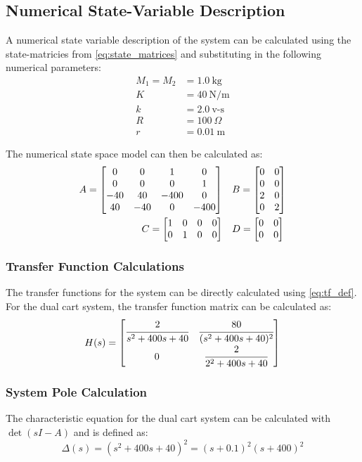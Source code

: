 \documentclass[]{article}
\begin{document}
	\subsection{Numerical State-Variable Description}
		A numerical state variable description of the system can be calculated using the state-matricies from \eqref{eq:state_matrices} and substituting in the following numerical parameters:
		\begin{align*}
			M_1 = M_2 &= 1.0 \ \text{kg} \\
			K &= 40 \ \text{N/m}\\
			k &= 2.0 \ \text{v-s} \\
			R &= 100  \ \Omega \\
			r &= 0.01 \ \text{m}
		\end{align*}
	
		The numerical state space model can then be calculated as:
		 \begin{equation}
			\begin{aligned}
				A = \mqty[	0	& 0		& 1		& 0\\
							0	& 0	 	& 0		& 1\\
							-40	& 40	& -400	& 0\\
							40	& -40	& 0		& -400
							] \ \ \
				&B = \mqty[ 0	& 0\\
							0	& 0\\
							2	& 0\\
							0	& 2
							]\\
				C = \mqty[	1	&0	&0	&0\\
							0	&1	&0	&0] \ \ \
				&D = \mqty[\zmat{2}{2}]
			\end{aligned}
			\label{eq:carts_state_matrices}
		\end{equation}
		
		\subsubsection{Transfer Function Calculations}
			The transfer functions for the system can be directly calculated using \eqref{eq:tf_def}. For the dual cart system, the transfer function matrix can be calculated as:
			\begin{equation}
				H(s) = \mqty[	\cfrac{2}{s^2+400s+40}	&\cfrac{80}{(s^2+400s+40)^2}\\
								0						&\cfrac{2}{2^2+400s+40}
								]
			\end{equation}
	
		\subsubsection{System Pole Calculation}
			The characteristic equation for the dual cart system can be calculated with $\det(sI-A)$ and is defined as:
			\begin{equation}
				\Delta (s) = (s^2 + 400s +40)^2 = (s+0.1)^2(s+400)^2
				\label{eq:carts_Delta_s}
			\end{equation}
			
\end{document}
